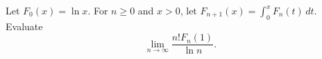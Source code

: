 Let $F_0(x) = \ln x$. For $n \geq 0$ and $x > 0$, let
$F_{n+1}(x) = \int_0^x F_n(t)\,dt$. Evaluate
\[
\lim_{n \to \infty} \frac{n! F_n(1)}{\ln n}.
\]
